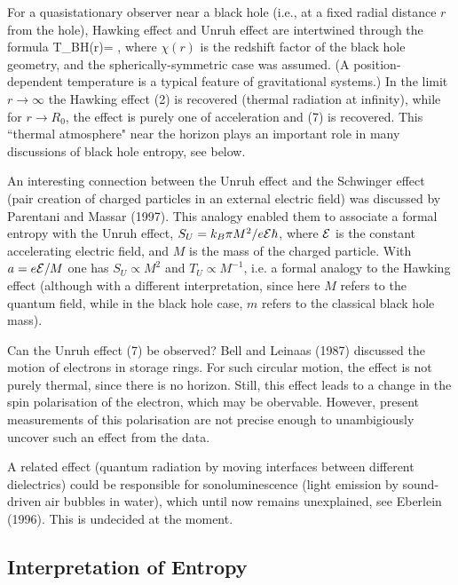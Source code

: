 For a quasistationary observer near a black hole (i.e., at
a fixed radial distance $r$ from the hole), Hawking effect and
Unruh effect are intertwined through the formula
\be T_{BH}(r)= \enspace , \ee
where $\chi(r)$ is the redshift factor of the black hole geometry,
and the spherically-symmetric case was assumed.
(A position-dependent temperature is a typical feature of
gravitational systems.)
In the limit $r\to\infty$ the Hawking effect (2) is recovered
(thermal radiation at infinity), while for $r\to R_0$, the
effect is purely one of acceleration and (7) is recovered.
This ``thermal atmosphere" near the horizon plays an important role
in many discussions of black hole entropy, see below.

An interesting connection between the Unruh effect and the
Schwinger effect (pair creation of charged particles in an external
electric field) was discussed by Parentani and Massar (1997).
This analogy enabled them to associate a formal entropy with
the Unruh effect, $S_U=k_B\pi M^2/e{\cal E}\hbar$,
 where ${\cal E}$ is the constant accelerating electric field,
and $M$ is the mass of the charged particle. With $a=e{\cal E}/M$
one has $S_U\propto M^2$ and $T_U\propto M^{-1}$, i.e. a formal analogy
to the Hawking effect (although with a different interpretation,
since here $M$ refers to the quantum field, while in the
black hole case, $m$ refers to the classical black hole mass).

\vskip 2mm
\small

Can the Unruh effect (7) be observed? Bell and Leinaas (1987)
discussed the motion of electrons in storage rings. For such circular
motion, the effect is not purely thermal, since there is no horizon.
Still, this effect leads to a change in the spin polarisation of
the electron, which may be obervable. However, present measurements
of this polarisation are not precise enough to unambigiously 
uncover such an effect from the data.

A related effect (quantum radiation by moving interfaces between
different dielectrics) could be responsible for sonoluminescence
(light emission by sound-driven air bubbles in water), which 
until now remains unexplained, see Eberlein (1996). This is
undecided at the moment.

\normalsize  

\subsection{Interpretation of Entropy}

